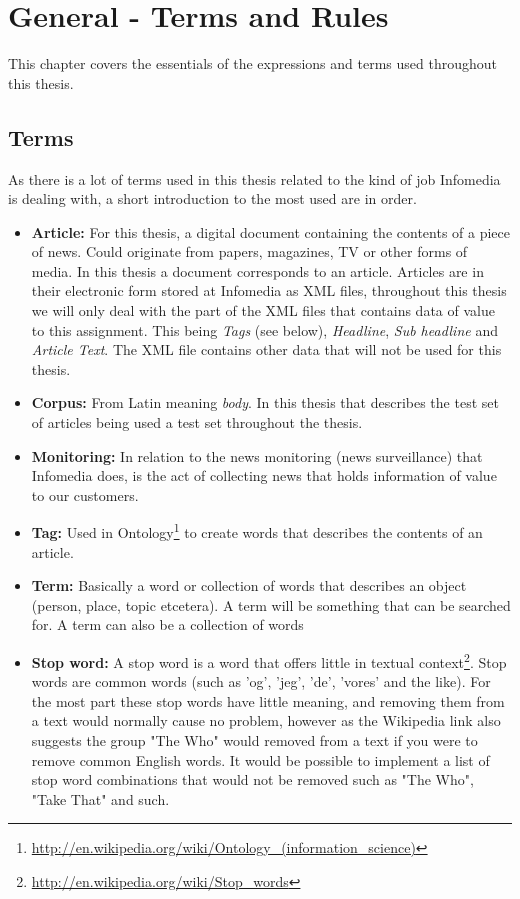 \chapter{General - Terms and Rules}

This chapter covers the essentials of the expressions and terms used throughout this thesis.

\section{Terms}

As there is a lot of terms used in this thesis related to the kind of job Infomedia is dealing with, a short introduction to the most used are in order.
\begin{itemize}
\item \textbf{Article:} For this thesis, a digital document containing the contents of a piece of news. Could originate from papers, magazines, TV or other forms of media. In this thesis a document corresponds to an article. Articles are in their electronic form stored at Infomedia as XML files, throughout this thesis we will only deal with the part of the XML files that contains data of value to this assignment. This being \textit{Tags} (see below), \textit{Headline}, \textit{Sub headline} and \textit{Article Text}. The XML file contains other data that will not be used for this thesis.
\item \textbf{Corpus:} From Latin meaning \textit{body}. In this thesis that describes the test set of articles being used a test set throughout the thesis.
\item \textbf{Monitoring:} In relation to the news monitoring (news surveillance) that Infomedia does, is the act of collecting news that holds information of value to our customers.
\item \textbf{Tag:} Used in Ontology\footnote{\url{http://en.wikipedia.org/wiki/Ontology_(information_science)}} to create words that describes the contents of an article.
\item \textbf{Term:} Basically a word or collection of words that describes an object (person, place, topic etcetera). A term will be something that can be searched for. A term can also be a collection of words
\item \textbf{Stop word:} A stop word is a word that offers little in textual context\footnote{\url{http://en.wikipedia.org/wiki/Stop_words}}. Stop words are common words (such as 'og', 'jeg', 'de', 'vores' and the like). For the most part these stop words have little meaning, and removing them from a text would normally cause no problem, however as the Wikipedia link also suggests the group "The Who" would removed from a text if you were to remove common English words. It would be possible to implement a list of stop word combinations that would not be removed such as "The Who", "Take That" and such.
\end{itemize}

